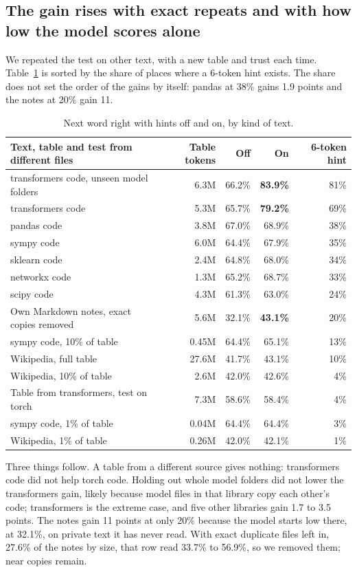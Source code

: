 \documentclass[11pt]{article}
\begin{document}
\subsection{The gain rises with exact repeats and with how low the model scores alone}
We repeated the test on other text, with a new table and trust each time. Table~\ref{tab:domains} is sorted by the share of places where a 6-token hint exists. The share does not set the order of the gains by itself: pandas at 38\% gains 1.9 points and the notes at 20\% gain 11.

\begin{table}[h]\centering\small
\begin{tabular}{lrrrr}\toprule
Text, table and test from different files & Table tokens & Off & On & 6-token hint\\\midrule
transformers code, unseen model folders & 6.3M & 66.2\% & \textbf{83.9\%} & 81\%\\
transformers code & 5.3M & 65.7\% & \textbf{79.2\%} & 69\%\\
pandas code & 3.8M & 67.0\% & 68.9\% & 38\%\\
sympy code & 6.0M & 64.4\% & 67.9\% & 35\%\\
sklearn code & 2.4M & 64.8\% & 68.0\% & 34\%\\
networkx code & 1.3M & 65.2\% & 68.7\% & 33\%\\
scipy code & 4.3M & 61.3\% & 63.0\% & 24\%\\
Own Markdown notes, exact copies removed & 5.6M & 32.1\% & \textbf{43.1\%} & 20\%\\
sympy code, 10\% of table & 0.45M & 64.4\% & 65.1\% & 13\%\\
Wikipedia, full table & 27.6M & 41.7\% & 43.1\% & 10\%\\
Wikipedia, 10\% of table & 2.6M & 42.0\% & 42.6\% & 4\%\\
Table from transformers, test on torch & 7.3M & 58.6\% & 58.4\% & 4\%\\
sympy code, 1\% of table & 0.04M & 64.4\% & 64.4\% & 3\%\\
Wikipedia, 1\% of table & 0.26M & 42.0\% & 42.1\% & 1\%\\
\bottomrule\end{tabular}
\caption{Next word right with hints off and on, by kind of text.}\label{tab:domains}
\end{table}

Three things follow. A table from a different source gives nothing: transformers code did not help torch code. Holding out whole model folders did not lower the transformers gain, likely because model files in that library copy each other's code; transformers is the extreme case, and five other libraries gain 1.7 to 3.5 points. The notes gain 11 points at only 20\% because the model starts low there, at 32.1\%, on private text it has never read. With exact duplicate files left in, 27.6\% of the notes by size, that row read 33.7\% to 56.9\%, so we removed them; near copies remain.
\end{document}
